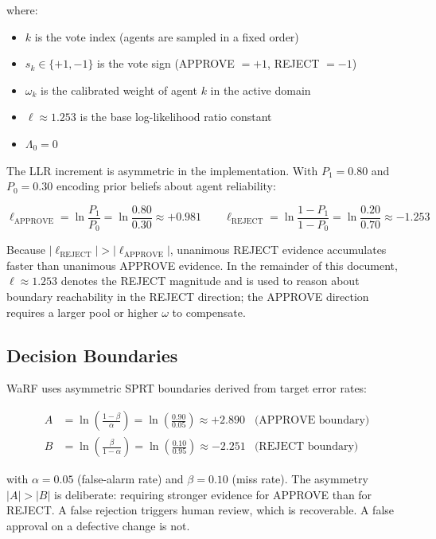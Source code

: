 \documentclass[11pt,a4paper]{article}
\begin{document}
\noindent where:
\begin{itemize}
  \item $k$ is the vote index (agents are sampled in a fixed order)
  \item $s_k \in \{+1,-1\}$ is the vote sign (APPROVE $=+1$, REJECT $=-1$)
  \item $\omega_k$ is the calibrated weight of agent $k$ in the active domain
  \item $\ell \approx 1.253$ is the base log-likelihood ratio constant
  \item $\Lambda_0 = 0$
\end{itemize}

The LLR increment is asymmetric in the implementation. With $P_1 = 0.80$
and $P_0 = 0.30$ encoding prior beliefs about agent reliability:

\[
  \ell_{\text{APPROVE}} = \ln\!\frac{P_1}{P_0}
    = \ln\!\frac{0.80}{0.30} \approx +0.981
  \qquad
  \ell_{\text{REJECT}} = \ln\!\frac{1-P_1}{1-P_0}
    = \ln\!\frac{0.20}{0.70} \approx -1.253
\]

Because $|\ell_{\text{REJECT}}| > |\ell_{\text{APPROVE}}|$, unanimous REJECT
evidence accumulates faster than unanimous APPROVE evidence. In the remainder
of this document, $\ell \approx 1.253$ denotes the REJECT magnitude and is
used to reason about boundary reachability in the REJECT direction; the
APPROVE direction requires a larger pool or higher $\omega$ to compensate.

\subsection{Decision Boundaries}

WaRF uses asymmetric SPRT boundaries derived from target error rates:

\begin{align}
  A &= \ln\!\left(\frac{1-\beta}{\alpha}\right)
     = \ln\!\left(\frac{0.90}{0.05}\right) \approx +2.890
  & \text{(APPROVE boundary)} \label{eq:A} \\
  B &= \ln\!\left(\frac{\beta}{1-\alpha}\right)
     = \ln\!\left(\frac{0.10}{0.95}\right) \approx -2.251
  & \text{(REJECT boundary)}  \label{eq:B}
\end{align}

\noindent with $\alpha = 0.05$ (false-alarm rate) and $\beta = 0.10$
(miss rate). The asymmetry $|A| > |B|$ is deliberate: requiring stronger
evidence for APPROVE than for REJECT. A false rejection triggers human review,
which is recoverable. A false approval on a defective change is not.
\end{document}

